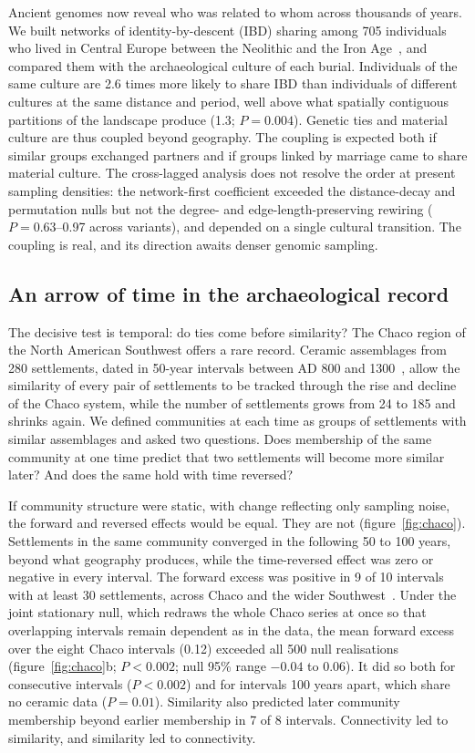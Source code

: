 \documentclass[11pt]{article}
\begin{document}
Ancient genomes now reveal who was related to whom across thousands of years. We built networks of
identity-by-descent (IBD) sharing among 705 individuals who lived in Central Europe between the Neolithic
and the Iron Age~\cite{Ringbauer2024,Mallick2024}, and compared them with the archaeological culture of
each burial. Individuals of the same culture are 2.6 times more likely to share IBD than individuals of
different cultures at the same distance and period, well above what spatially contiguous partitions of
the landscape produce (1.3; $P=0.004$). Genetic ties and material culture are thus coupled beyond
geography. The coupling is expected both if similar groups exchanged partners and if groups linked by
marriage came to share material culture. The cross-lagged analysis does not resolve the order at present
sampling densities: the network-first coefficient exceeded the distance-decay and permutation nulls but
not the degree- and edge-length-preserving rewiring ($P=0.63$--0.97 across variants), and depended on a
single cultural transition. The coupling is real, and its direction awaits denser genomic sampling.

\subsection{An arrow of time in the archaeological record}

The decisive test is temporal: do ties come before similarity? The Chaco region of the North American
Southwest offers a rare record. Ceramic assemblages from 280 settlements, dated in 50-year intervals
between AD 800 and 1300~\cite{Mills2018,Daems2023}, allow the similarity of every pair of settlements to
be tracked through the rise and decline of the Chaco system, while the number of settlements grows from
24 to 185 and shrinks again. We defined communities at each time as groups of settlements with similar
assemblages and asked two questions. Does membership of the same community at one time predict that two
settlements will become more similar later? And does the same hold with time reversed?

If community structure were static, with change reflecting only sampling noise, the forward and reversed
effects would be equal. They are not (figure~\ref{fig:chaco}). Settlements in the same community
converged in the following 50 to 100 years, beyond what geography produces, while the time-reversed
effect was zero or negative in every interval. The forward excess was positive in 9 of 10 intervals with
at least 30 settlements, across Chaco and the wider Southwest~\cite{Mills2013}. Under the joint
stationary null, which redraws the whole Chaco series at once so that overlapping intervals remain
dependent as in the data, the mean forward excess over the eight Chaco intervals (0.12) exceeded all 500
null realisations (figure~\ref{fig:chaco}b; $P<0.002$; null 95\% range $-0.04$ to 0.06). It did so both
for consecutive intervals ($P<0.002$) and for intervals 100 years apart, which share no ceramic data
($P=0.01$). Similarity also predicted later community membership beyond earlier membership in 7 of 8
intervals. Connectivity led to similarity, and similarity led to connectivity.
\end{document}
